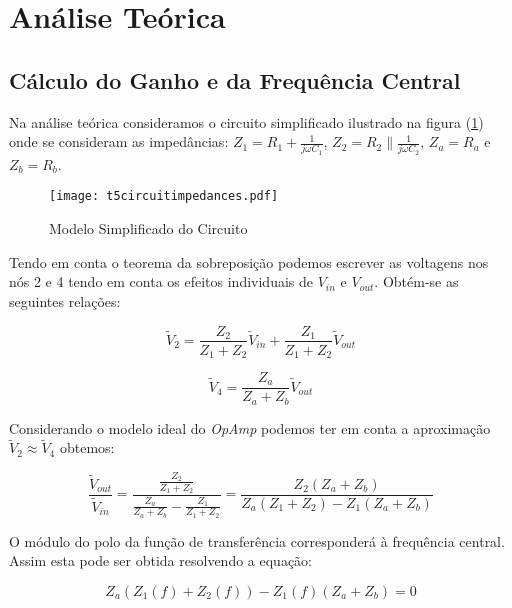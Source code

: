 \section{Análise Teórica}
\label{sec:analysis}


\subsection{Cálculo do Ganho e da Frequência Central}

Na análise teórica consideramos o circuito simplificado ilustrado na figura (\ref{fig:CircuitoSimplificado}) onde se consideram as impedâncias: 
$Z_1 = R_1 + \frac{1}{j \omega C_1}$, $Z_2 = R_2 \parallel \frac{1}{j \omega C_2}$, $Z_a = R_a$ e $Z_b = R_b$.

\begin{figure}[H] \centering
    \texttt{[image: t5circuitimpedances.pdf]}
    \caption{Modelo Simplificado do Circuito}
    \label{fig:CircuitoSimplificado}
\end{figure}

Tendo em conta o teorema da sobreposição podemos escrever as voltagens nos nós 2 e 4 tendo em conta os efeitos individuais de $V_{in}$ e $V_{out}$. 
Obtém-se as seguintes relações:

\begin{equation}
    \widetilde{V}_2 = \frac{Z_2}{Z_1 + Z_2} \widetilde{V}_{in} + \frac{Z_1}{Z_1 + Z_2} \widetilde{V}_{out}
\end{equation}

\begin{equation}
    \widetilde{V}_4 = \frac{Z_a}{Z_a + Z_b} \widetilde{V}_{out}
\end{equation}

Considerando o modelo ideal do \emph{OpAmp} podemos ter em conta a aproximação $\widetilde{V}_2 \approx \widetilde{V}_4$ obtemos:

\begin{equation}
    \frac{\widetilde{V}_{out}}{\widetilde{V}_{in}} = \frac{\frac{Z_2}{Z_1 + Z_2}}{\frac{Z_a}{Z_a + Z_b} - \frac{Z_1}{Z_1 + Z_2}} = \frac{Z_2(Z_a + Z_b)}{Z_a(Z_1 + Z_2) - Z_1(Z_a + Z_b)}
    \label{eq:Ganho}
\end{equation}

O módulo do polo da função de transferência corresponderá à frequência central. Assim esta pode ser obtida resolvendo a equação:

\begin{equation}
    Z_a (Z_1(f) + Z_2(f)) - Z_1(f) (Z_a + Z_b) = 0 
\end{equation}


